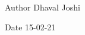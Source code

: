 \begin{DoxyAuthor}{Author}
Dhaval Joshi 
\end{DoxyAuthor}
\begin{DoxyDate}{Date}
15-\/02-\/21 
\end{DoxyDate}
